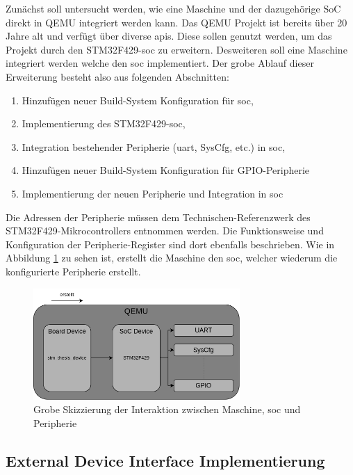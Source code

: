 Zunächst soll untersucht werden, wie eine Maschine und der dazugehörige SoC
direkt in QEMU integriert werden kann.
Das QEMU Projekt ist bereits über 20 Jahre alt und verfügt über diverse
\acp{api}.
Diese sollen genutzt werden, um das Projekt durch den STM32F429-\ac{soc} zu
erweitern.
Desweiteren soll eine Maschine integriert werden welche den \ac{soc}
implementiert.
Der grobe Ablauf dieser Erweiterung besteht also aus folgenden Abschnitten:
\begin{enumerate}
    \item Hinzufügen neuer Build-System Konfiguration für \ac{soc},
    \item Implementierung des STM32F429-\ac{soc},
    \item Integration bestehender Peripherie (\ac{uart}, SysCfg, etc.) in
        \ac{soc},
    \item Hinzufügen neuer Build-System Konfiguration für GPIO-Peripherie
    \item Implementierung der neuen Peripherie und Integration in \ac{soc}
\end{enumerate}
Die Adressen der Peripherie müssen dem Technischen-Referenzwerk des
STM32F429-Mikrocontrollers entnommen werden.
Die Funktionsweise und Konfiguration der Peripherie-Register sind dort
ebenfalls beschrieben.
Wie in Abbildung \ref{fig:QemuDeviceErweiterung} zu sehen ist, erstellt die
Maschine den \ac{soc}, welcher wiederum die konfigurierte Peripherie erstellt.
\begin{figure}[!htb]
    \centering
    \includegraphics[width=0.7\textwidth]{anlagen/bilder/Qemu_Device}
    \caption{Grobe Skizzierung der Interaktion zwischen Maschine, \ac{soc} und Peripherie}
    \label{fig:QemuDeviceErweiterung}
\end{figure}


\subsection{External Device Interface Implementierung}

